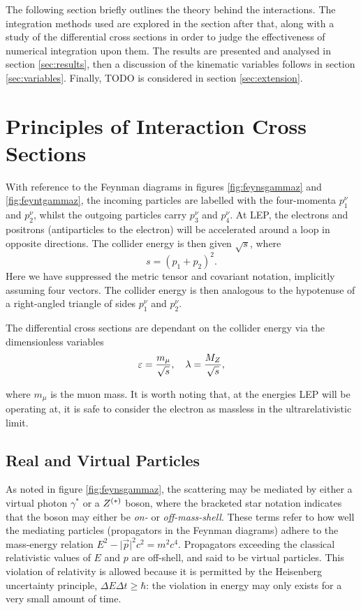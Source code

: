 \documentclass[]{article}
\begin{document}
The following section briefly outlines the theory behind the interactions. The integration methods used are explored in the section after that, along with a study of the differential cross sections in order to judge the effectiveness of numerical integration upon them. The results are presented and analysed in section \ref{sec:results}, then a discussion of the kinematic variables follows in section \ref{sec:variables}. Finally, TODO is considered in section \ref{sec:extension}.

\section{Principles of Interaction Cross Sections}

With reference to the Feynman diagrams in figures \ref{fig:feynsgammaz} and \ref{fig:feyntgammaz}, the incoming particles are labelled with the four-momenta $p_{1}^{\nu}$ and $p_{2}^{\nu}$, whilst the outgoing particles carry $p_{3}^{\nu}$ and $p_{4}^{\nu}$. At LEP, the electrons and positrons (antiparticles to the electron) will be accelerated around a loop in opposite directions. The collider energy is then given $\sqrt{s}$, where $$s = (p_{1} + p_{2})^{2}.$$ Here we have suppressed the metric tensor and covariant notation, implicitly assuming four vectors. The collider energy is then analogous to the hypotenuse of a right-angled triangle of sides $p_{1}^{\nu}$ and $p_{2}^{\nu}$.

The differential cross sections are dependant on the collider energy via the dimensionless variables $$\varepsilon = \frac{m_{\mu}}{\sqrt{s}}, \quad \lambda = \frac{M_{Z }}{\sqrt{s}},$$

where $m_{\mu}$ is the muon mass. It is worth noting that, at the energies LEP will be operating at, it is safe to consider the electron as massless in the ultrarelativistic limit.

\subsection{Real and Virtual Particles}

As noted in figure \ref{fig:feynsgammaz}, the scattering may be mediated by either a virtual photon $\gamma^{*}$ or a $Z ^{(*)}$ boson, where the bracketed star notation indicates that the boson may either be \emph{on-} or \emph{off-mass-shell}. These terms refer to how well the mediating particles (propagators in the Feynman diagrams) adhere to the mass-energy relation $E^{2} - \lvert{\vec{p}}\rvert^{2}c^{2} = m^{2}c^{4}$. Propagators exceeding the classical relativistic values of $E$ and $p$ are off-shell, and said to be virtual particles. This violation of relativity is allowed because it is permitted by the Heisenberg uncertainty principle, $\Delta E\Delta t \geq \hbar$: the violation in energy may only exists for a very small amount of time.
\end{document}
